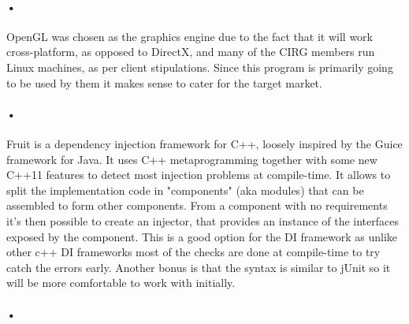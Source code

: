 \documentclass[11pt]{article}
\begin{document}
\paragraph{•}
OpenGL was chosen as the graphics engine due to the fact that it will work cross-platform, as opposed to DirectX, and many of the CIRG members run Linux machines, as per client stipulations. Since this program is primarily going to be used by them it makes sense to cater for the target market. 
\paragraph{•}
Fruit is a dependency injection framework for C++, loosely inspired by the Guice framework for Java. It uses C++ metaprogramming together with some new C++11 features to detect most injection problems at compile-time. It allows to split the implementation code in "components" (aka modules) that can be assembled to form other components. From a component with no requirements it's then possible to create an injector, that provides an instance of the interfaces exposed by the component. This is a good option for the DI framework as unlike other c++ DI frameworks most of the checks are done at compile-time to try catch the errors early. Another bonus is that the syntax is similar to jUnit so it will be more comfortable to work with initially.

\paragraph{•}
\end{document}
